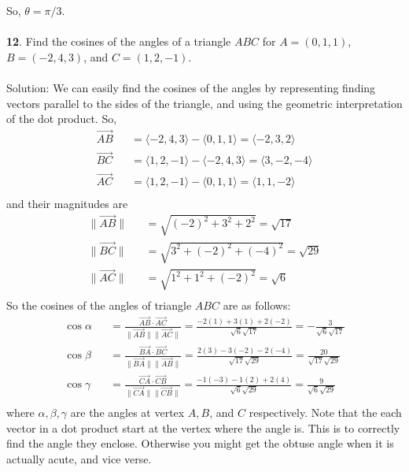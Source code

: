 \documentclass[12pt]{amsbook}
\newcommand{\la}{\langle}
\newcommand{\ra}{\rangle}
\begin{document}
So, $\theta = \pi/3$.\\
\\
{\small\bf 12}. Find the cosines of the angles of a triangle $ABC$ for
$A=(0,1,1)$, $B=(-2,4,3)$, and $C=(1,2,-1)$.\\
\\
{\sc Solution}:
We can easily find the cosines of the angles by representing finding vectors parallel to the sides of the triangle, and using the geometric interpretation of the dot product. So,
\begin{eqnarray*}
\overrightarrow{AB}&&=\la -2,4,3 \ra - \la 0,1,1 \ra = \la -2,3,2 \ra \\
\overrightarrow{BC}&&=\la 1,2,-1 \ra - \la -2,4,3 \ra = \la 3,-2,-4 \ra \\
\overrightarrow{AC}&&=\la 1,2,-1 \ra - \la 0,1,1 \ra = \la 1,1,-2 \ra \\
\end{eqnarray*}
and their magnitudes are
\begin{eqnarray*}
\|\overrightarrow{AB}\|&&=\sqrt{(-2)^2+3^2+2^2}=\sqrt{17}\\
\|\overrightarrow{BC}\|&&=\sqrt{3^2+(-2)^2+(-4)^2}=\sqrt{29}\\
\|\overrightarrow{AC}\|&&=\sqrt{1^2+1^2+(-2)^2}=\sqrt{6}\\
\end{eqnarray*}
So the cosines of the angles of triangle $ABC$ are as follows:
\begin{eqnarray*}
\cos\alpha&&=\frac{\overrightarrow{AB}\cdot\overrightarrow{AC}}{\|\overrightarrow{AB}\|\|\overrightarrow{AC}\|}=\frac{-2(1)+3(1)+2(-2)}{\sqrt{6}\sqrt{17}}=-\frac{3}{\sqrt{6}\sqrt{17}}\\
\cos\beta&&=\frac{\overrightarrow{BA}\cdot\overrightarrow{BC}}{\|\overrightarrow{BA}\|\|\overrightarrow{AB}\|}=\frac{2(3)-3(-2)-2(-4)}{\sqrt{17}\sqrt{29}}=\frac{20}{\sqrt{17}\sqrt{29}}\\
\cos\gamma&&=\frac{\overrightarrow{CA}\cdot\overrightarrow{CB}}{\|\overrightarrow{CA}\|\|\overrightarrow{CB}\|}=\frac{-1(-3)-1(2)+2(4)}{\sqrt{6}\sqrt{29}}=\frac{9}{\sqrt{6}\sqrt{29}}\\
\end{eqnarray*}
where $\alpha, \beta, \gamma$ are the angles at vertex $A,B$, and $C$ respectively. Note that the each vector in a dot product start at the vertex where the angle is. This is to correctly find the angle they enclose. Otherwise you might get the obtuse angle when it is actually acute, and vice verse.
\\
\\
\end{document}
